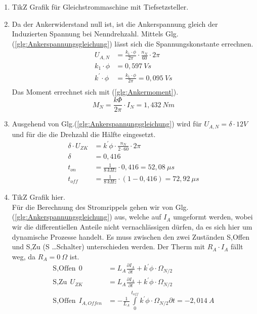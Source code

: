 \begin{solution}
\begin{enumerate}
\item TikZ Grafik für Gleichstrommaschine mit Tiefsetzsteller.
\item Da der Ankerwiderstand null ist, ist die Ankerspannung gleich der Induzierten Spannung bei Nenndrehzahl. Mittels Glg.(\ref{glg:Ankerspannungsgleichung}) lässt sich die Spannungskonstante errechnen.
\begin{align}
U_{A,N} &= \frac{k_1 \cdot \phi}{2 \pi} \cdot \frac{n_N}{60} \cdot 2 \pi\\
k_1 \cdot \phi &= 0,597~Vs\\
k^{'} \cdot \phi &= \frac{k_1 \cdot \phi}{2 \pi} = 0,095~Vs\\
\end{align}
Das Moment errechnet sich mit (\ref{glg:Ankermoment}).\\
\begin{equation}
M_N=\frac{k \Phi}{2 \pi} \cdot I_N =1,432~Nm
\end{equation}
\item Ausgehend von Glg.(\ref{glg:Ankerspannungsgleichung}) wird für $U_{A,N} = \delta \cdot 12V$ und für die die Drehzahl die Hälfte eingesetzt.
\begin{align}
\delta \cdot U_{ZK} &= k^{'} \phi \cdot \frac{n_N}{2 \cdot 60} \cdot 2 \pi \\
\delta &= 0,416\\
t_{on} &= \frac{1}{8~kHz} \cdot 0,416 = 52,08~\mu s\\
t_{off} &= \frac{1}{8~kHz} \cdot(1- 0,416) = 72,92~\mu s
\end{align}
\item TikZ Grafik hier.\\
Für die Berechnung des Stromrippels gehen wir von Glg.(\ref{glg:Ankerspannungsgleichung}) aus, welche auf $I_A$ umgeformt werden, wobei wir die differentiellen Anteile nicht vernachlässigen dürfen, da es sich hier um dynamische Prozesse handelt. Es muss zwischen den zwei Zuständen S,Offen und S,Zu (S \dots Schalter) unterschieden werden. Der Therm mit $R_A \cdot I_A$ fällt weg, da $R_A= 0~\Omega$ ist.
\begin{align}
\text{S,Offen}~~ 0 &= L_A \frac{\partial I_A}{\partial t} + k^{'} \phi \cdot \Omega_{N/2}\\
\text{S,Zu}~~ U_{ZK} &= L_A \frac{\partial I_A}{\partial t} + k^{'} \phi \cdot \Omega_{N/2}\\
\text{S,Offen} ~~ I_{A,Offen} &= -\frac{1}{L_A} \int \limits_{0}^{t_{off}} k^{'} \phi \cdot \Omega_{N/2} \partial t=-2,014~A\\

\end{align}
\end{enumerate}
\end{solution}
